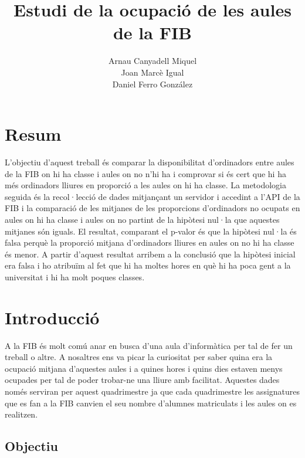 \documentclass[a4paper, 12pt]{article}
\begin{document}
\title{\huge{Estudi de la ocupació de les aules de la FIB}}
\author{Arnau Canyadell Miquel \\ Joan Marcè Igual \\ Daniel Ferro González}

\maketitle
\thispagestyle{empty}

\newpage
\tableofcontents
\thispagestyle{empty}

\newpage
{}
\setcounter{page}{1}

\section{Resum}


L'objectiu d'aquest treball és comparar la disponibilitat d'ordinadors entre aules de la FIB on hi ha classe i aules on no n'hi ha i comprovar si és cert que hi ha més ordinadors lliures en proporció a les aules on hi ha classe.
La metodologia seguida és la recol·lecció de dades mitjançant un servidor i accedint a l'API de la FIB i la comparació de les mitjanes de les proporcions d'ordinadors no ocupats en aules on hi ha classe i aules on no partint de la hipòtesi nul·la que aquestes mitjanes són iguals.
El resultat, comparant el p-valor és que la hipòtesi nul·la és falsa perquè la proporció mitjana d'ordinadors lliures en aules on no hi ha classe és menor.
A partir d'aquest resultat arribem a la conclusió que la hipòtesi inicial era falsa i ho atribuïm al fet que hi ha moltes hores en què hi ha poca gent a la universitat i hi ha molt poques classes.

\section{Introducció}

A la FIB és molt comú anar en busca d'una aula d'informàtica per tal de fer un treball o altre. A nosaltres ens va picar la curiositat per saber quina era la ocupació mitjana d'aquestes aules i a quines hores i quins dies estaven menys ocupades per tal de poder trobar-ne una lliure amb facilitat. Aquestes dades només serviran per aquest quadrimestre ja que cada quadrimestre les assignatures que es fan a la FIB canvien el seu nombre d'alumnes matriculats i les aules on es realitzen.

\subsection{Objectiu}
\end{document}
